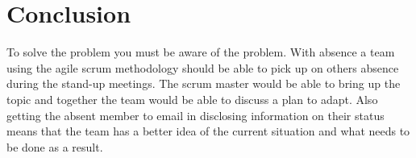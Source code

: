 \documentclass{scrartcl}
\begin{document}
\section{Conclusion}

To solve the problem you must be aware of the problem. With absence a team using the agile scrum methodology should be able to pick up on others absence during the stand-up meetings. The scrum master would be able to bring up the topic and together the team would be able to discuss a plan to adapt. Also getting the absent member to email in disclosing information on their status means that the team has a better idea of the current situation and what needs to be done as a result.



\end{document}

